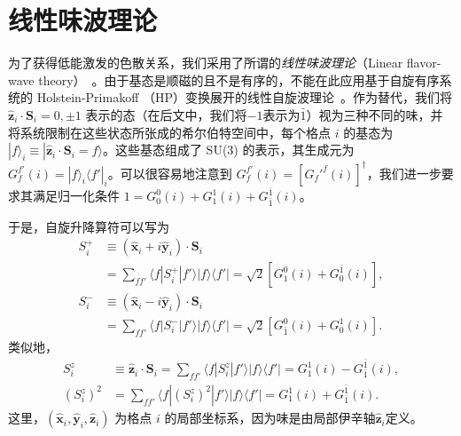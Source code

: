 \section{线性味波理论}
    为了获得低能激发的色散关系，我们采用了所谓的\emph{线性味波理论}（Linear flavor-wave theory）~\cite{joshi1999elementary,li19984}。由于基态是顺磁的且不是有序的，不能在此应用基于自旋有序系统的 Holstein-Primakoff （HP）变换展开的线性自旋波理论~\cite{holstein1940field}。作为替代，我们将 $\hat{\symbf{z}}_i\cdot\symbf{S}_i=0,\pm 1$ 表示的态（在后文中，我们将$-1$表示为$\bar{1}$）视为三种不同的味，并将系统限制在这些状态所张成的希尔伯特空间中，每个格点 $i$ 的基态为$|f\rangle_i\equiv|\hat{\symbf{z}}_i\cdot\symbf{S}_i=f\rangle$。这些基态组成了 SU(3) 的表示，其生成元为 $G_f^{f'}(i)=|f\rangle_i\langle f'|_i$。可以很容易地注意到 $G_f^{f'}(i)=\left[G_f'^{f}(i)\right]^\dagger$，我们进一步要求其满足归一化条件 $1=G_0^{0}(i)+G_1^{1}(i)+G_{\bar{1}}^{\bar{1}}(i)$。
    
    于是，自旋升降算符可以写为~\cite{ma2024upper}
    \begin{align}
        S_i^+&\equiv(\hat{\symbf{x}}_i+i\hat{\symbf{y}}_i)\cdot\symbf{S}_i\nonumber\\
        &=\sum_{ff'}\langle f|S_i^+|f' \rangle|f \rangle\langle f'|=\sqrt{2}\left[G_1^0(i)+G_0^{\bar{1}}(i)\right],\\
        S_i^-&\equiv(\hat{\symbf{x}}_i-i\hat{\symbf{y}}_i)\cdot\symbf{S}_i\nonumber\\
        &=\sum_{ff'}\langle f|S_i^-|f' \rangle|f \rangle\langle f'|=\sqrt{2}\left[G_{\bar{1}}^0(i)+G_0^1(i)\right].
    \end{align}
    类似地，
    \begin{align}
         S_i^z&\equiv\hat{\symbf{z}}_i\cdot\symbf{S}_i=\sum_{ff'}\langle f|S_i^z|f' \rangle|f \rangle\langle f'|=G_1^1(i)-G_{\bar{1}}^{\bar{1}}(i),\\
        (S_i^z)^2&=\sum_{ff'}\langle f|(S_i^z)^2|f' \rangle|f \rangle\langle f'|=G_1^1(i)+G_{\bar{1}}^{\bar{1}}(i).
    \end{align}
    这里，$(\hat{\symbf{x}}_i,\hat{\symbf{y}}_i,\hat{\symbf{z}}_i)$ 为格点 $i$ 的局部坐标系，因为味是由局部伊辛轴$\hat{\symbf{z}}_i$定义。
    
